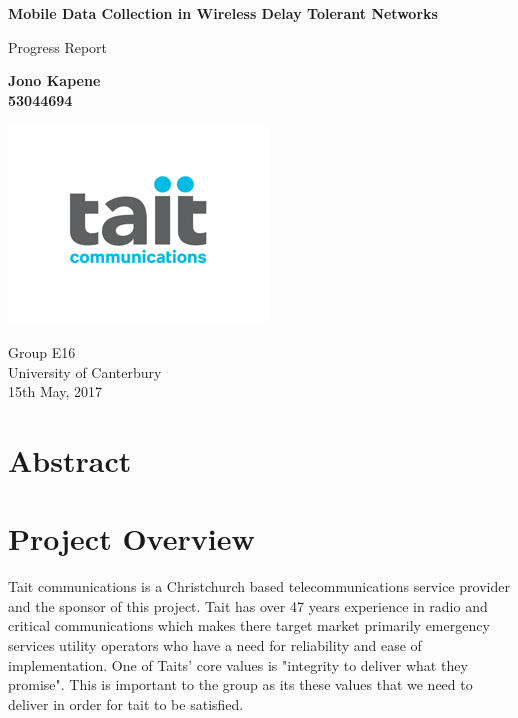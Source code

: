 \documentclass[a4paper,12pt]{article}
\begin{document}
	\begin{titlepage}
    	\begin{center}
        	\vspace*{1cm}
        
        	\textbf{Mobile Data Collection in Wireless Delay Tolerant Networks}
        
        	\vspace{0.5cm}
        	Progress Report
        
        	\vspace{1.5cm}
        
        	\textbf{Jono Kapene \\ 53044694}
        
        	\vfill
        	\includegraphics[scale=0.8]{Tait-Communications-logo.png}\\
        		
        	\vspace{0.8cm}
        
        	Group E16\\
        	University of Canterbury\\
        	15th May, 2017
        
		\end{center}
	\end{titlepage}

	\clearpage
	\tableofcontents
	\listoffigures
	\listoftables
	\clearpage
	
	
\section{Abstract}
\clearpage

\section{Project Overview}
Tait communications is a Christchurch based telecommunications service provider and the sponsor of this project. Tait has over 47 years experience in radio and critical communications which makes there target market primarily emergency services utility operators who have a need for reliability and ease of implementation. One of Taits' core values is "integrity to deliver what they promise". This is important to the group as its these values that we need to deliver in order for tait to be satisfied.\\
\end{document}
